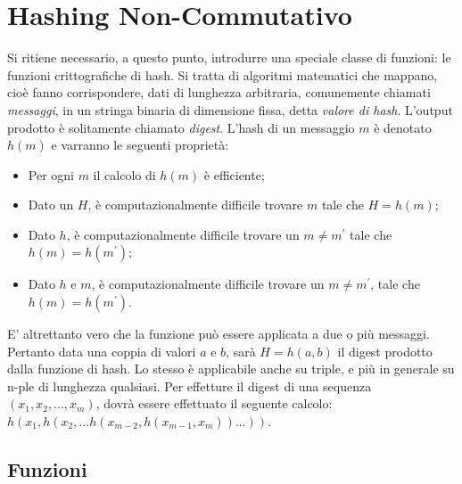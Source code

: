 	
\section{Hashing Non-Commutativo}
	

	Si ritiene necessario, a questo punto, introdurre una speciale classe di funzioni: le funzioni crittografiche di hash. Si tratta di algoritmi matematici che mappano, cioè fanno corrispondere, dati di lunghezza arbitraria, comunemente chiamati \textit{messaggi}, in un stringa binaria di dimensione fissa, detta \textit{valore di hash}. L'output prodotto è solitamente chiamato \textit{digest}. 
	L'hash di un messaggio $ m $ è denotato $ h(m) $ e varranno le seguenti proprietà: \cite{slide_pizzo}
	
	\begin{itemize}
		\item Per ogni $ m $ il calcolo di $ h(m) $ è efficiente;
		\item Dato un $ H $, è computazionalmente difficile trovare $ m $ tale che $ H = h(m) $;
		\item Dato $ h $, è computazionalmente difficile trovare un $ m \ne m^{'}$ tale che $ h(m) = h(m^{'}) $;
		\item Dato $ h $ e $ m $, è computazionalmente difficile trovare un $ m \ne m^{'} $, tale che $ h(m) = h(m^{'}) $.
	\end{itemize}

	E' altrettanto vero che la funzione può essere applicata a due o più messaggi. Pertanto data una coppia di valori $ a $ e $ b $, sarà $ H = h(a,b) $ il digest prodotto dalla funzione di hash. Lo stesso è applicabile anche su triple, e più in generale su n-ple di lunghezza qualsiasi. Per effetture il digest di una sequenza $ (x_{1}, x_{2}, ... , x_{m}) $, dovrà essere effettuato il seguente calcolo: $ h(x_{1}, h(x_{2}, ... h(x_{m-2},h(x_{m-1},x_{m}))...)) $. \cite{authskiplist}
	
		\subsection{Funzioni}
	
			
